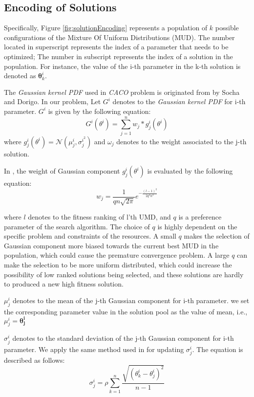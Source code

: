 \documentclass[journal]{IEEEtran}
\renewcommand{\vec}[1]{\mathbf{#1}}
\begin{document}
\subsection{Encoding of Solutions}
Specifically, Figure \ref {fig:solutionEncoding} represents a population of \(k\) possible configurations of the Mixture Of Uniform Distributions (MUD). The number located in superscript represents the index of a parameter that needs to be optimized; The number in subscript represents the index of a solution in the population. For instance, the value of the i-th parameter in the k-th solution is denoted as  \(\vec{\theta}^i_k\). 

The \emph{Gaussian kernel PDF} used in \emph{CACO} problem is originated from \cite{caco} by Socha and Dorigo. In our problem, Let \(G^{i}\) denotes to the \emph{Gaussian kernel PDF} for i-th parameter. \(G^{i}\) is given by the following equation:
\[G^{i}(\theta^{i}) = \sum_{j = 1}^{n} w_{j}*g_{j}^{i}(\theta^{i})\]
where \(g_{j}^{i}(\theta^{i}) = \mathcal{N}(\mu_{j}^{i},\sigma_{j}^{i^{2}})\) and  \(\omega_{j}\) denotes to the weight associated to the j-th solution. 

In \cite{caco}, the weight of Gaussian component \(g_{j}^{i}(\theta^{i})\) is evaluated by the following equation:
\[w_{j} = \frac{1}{qn\sqrt{2\pi}}e^{-\frac{(l-1)^2}{2q^2n^2}}\] 

where \(l\) denotes to the fitness ranking of l'th UMD, and \(q\) is a preference parameter of the search algorithm. The choice of \(q\) is highly dependent on the specific problem and constraints of the resources. A small \(q\) makes the selection of Gaussian component more biased towards the current best MUD in the population, which could cause the premature convergence problem. A large \(q\) can make the selection to be more uniform distributed, which could increase the possibility of low ranked solutions being selected, and these solutions are hardly to produced a new high fitness solution. 

\(\mu_{j}^{i}\) denotes to the mean of the j-th Gaussian component for i-th parameter. we set the corresponding parameter value in the solution pool as the value of mean, i.e., \(\mu_{j}^{i} = \vec{\theta_{j}^{i}}\)

\(\sigma^{i}_{j}\) denotes to the standard deviation of the j-th Gaussian component for i-th parameter. We apply the same method used in \cite{caco} for updating \(\sigma^{i}_{j}\). The equation is described as follows:
\[\sigma^{i}_{j} = \rho\sum_{k = 1}^{n}\frac{\sqrt{(\theta_{k}^{i} - \theta^{i}_{j})^2}}{n-1}\]
\end{document}
